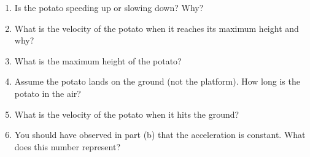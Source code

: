 \documentclass[11pt,fleqn]{article}
\begin{document}
\begin{enumerate}
\begin{enumerate}
	\item Is the potato speeding up or slowing down? Why?
	\vfill
	\item What is the velocity of the potato when it reaches its maximum height and why?
	\vfill
	\item What is the maximum height of the potato?
	\vfill
	\item Assume the potato lands on the ground (not the platform). How long is the potato in the air?
	\vfill
	\item What is the velocity of the potato when it hits the ground?
	\vfill
	\item You should have observed in part (b) that the acceleration is constant. What does this number represent? 
	\vfill
	\end{enumerate}
\end{enumerate}
\end{document}
